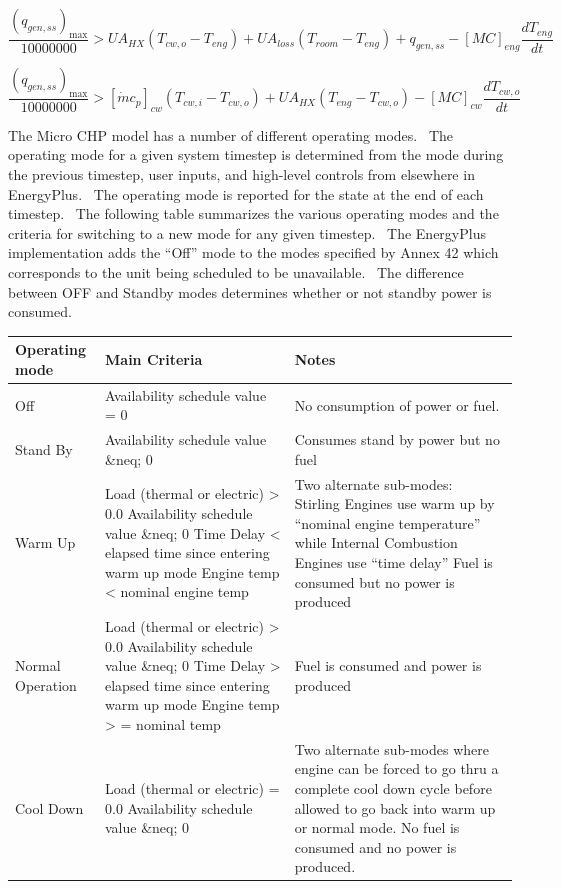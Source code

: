 \begin{equation}
\frac{{{{\left( {{q_{gen,ss}}} \right)}_{\max }}}}{{10000000}} > U{A_{HX}}\left( {{T_{cw,o}} - {T_{eng}}} \right) + U{A_{loss}}\left( {{T_{room}} - {T_{eng}}} \right) + {q_{gen,ss}} - {[MC]_{eng}}\frac{{d{T_{eng}}}}{{dt}}
\end{equation}

\begin{equation}
\frac{{{{\left( {{q_{gen,ss}}} \right)}_{\max }}}}{{10000000}} > {[\dot m{c_p}]_{cw}}\left( {{T_{cw,i}} - {T_{cw,o}}} \right) + U{A_{HX}}\left( {{T_{eng}} - {T_{cw,o}}} \right) - {[MC]_{cw}}\frac{{d{T_{cw,o}}}}{{dt}}
\end{equation}

The Micro CHP model has a number of different operating modes.~ The operating mode for a given system timestep is determined from the mode during the previous timestep, user inputs, and high-level controls from elsewhere in EnergyPlus.~ The operating mode is reported for the state at the end of each timestep.~ The following table summarizes the various operating modes and the criteria for switching to a new mode for any given timestep.~ The EnergyPlus implementation adds the ``Off'' mode to the modes specified by Annex 42 which corresponds to the unit being scheduled to be unavailable.~ The difference between OFF and Standby modes determines whether or not standby power is consumed.

\begin{longtable}[c]{p{1.5in}p{2.05in}p{2.44in}}
\toprule 
Operating mode & Main Criteria & Notes \tabularnewline \midrule
\endhead
Off & Availability schedule value = 0 & No consumption of power or fuel. \tabularnewline
Stand By & Availability schedule value  \&neq;  0 & Consumes stand by power but no fuel \tabularnewline
Warm Up & Load (thermal or electric)  >  0.0 Availability schedule value  \&neq;  0 Time Delay  <  elapsed time since entering warm up mode Engine temp  <  nominal engine temp & Two alternate sub-modes:~ Stirling Engines use warm up by “nominal engine temperature” while Internal Combustion Engines use “time delay” Fuel is consumed but no power is produced \tabularnewline
Normal Operation & Load (thermal or electric)  >  0.0 Availability schedule value  \&neq;  0 Time Delay  >  elapsed time since entering warm up mode Engine temp  >  = nominal temp & Fuel is consumed and power is produced \tabularnewline
Cool Down & Load (thermal or electric) = 0.0 Availability schedule value  \&neq;  0 & Two alternate sub-modes where engine can be forced to go thru a complete cool down cycle before allowed to go back into warm up or normal mode. No fuel is consumed and no power is produced. \tabularnewline
\bottomrule
\end{longtable}

